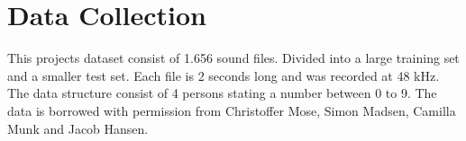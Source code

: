 \section*{Data Collection}

This projects dataset consist of 1.656 sound files. 
Divided into a large training set and a smaller test set. 
Each file is 2 seconds long and was recorded at 48 kHz.
The data structure consist of 4 persons stating a number between 0 to 9. 
The data is borrowed with permission from Christoffer Mose, Simon Madsen, Camilla Munk and Jacob Hansen.
  